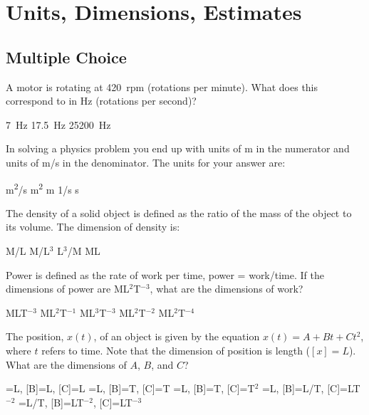\section{Units, Dimensions, Estimates}

\subsection{Multiple Choice}
\question A motor is rotating at \SI{420}{rpm} (rotations per minute). What does this correspond to in \si{Hz} (rotations per second)?
\begin{checkboxes}
\CorrectChoice \SI{7}{Hz} \correct
\choice \SI{17.5}{Hz}
\choice \SI{25200}{Hz}
\end{checkboxes}

\question In solving a physics problem you end up with units of \si{m} in the numerator and units of \si{m/s} in the denominator. The units for your answer are:
\begin{checkboxes}
\choice \si{m^2/s}
\choice \si{m^2}
\choice \si{m}
\choice \si{1/s}
\CorrectChoice  \si{s} \correct
\end{checkboxes}

\question The density of a solid object is defined as the ratio of the mass of the object to its volume. The dimension of density is:
\begin{checkboxes}
\choice M/L
\CorrectChoice  M/L$^3$ \correct
\choice L$^3$/M
\choice ML
\end{checkboxes}

\question Power is defined as the rate of work per time, power = work/time.  If the dimensions of power are ML$^2$T$^{-3}$, what are the dimensions of work?  
\begin{checkboxes}
\choice MLT$^{-3}$
\choice ML$^2$T$^{-1}$
\choice ML$^{3}$T$^{-3}$
\CorrectChoice ML$^{2}$T$^{-2}$ \correct
\choice ML$^2$T$^{-4}$
\end{checkboxes}

\question The position, $x(t)$, of an object is given by the equation $x(t) = A + Bt +Ct^2$, where $t$ refers to time. Note that the dimension of position is length ($[x]=L$).  What are the dimensions of $A$, $B$, and $C$?  
\begin{checkboxes}
\choice [A]=L, [B]=L, [C]=L
\choice [A]=L, [B]=T, [C]=T
\choice [A]=L, [B]=T, [C]=T$^2$
\CorrectChoice [A]=L, [B]=L/T, [C]=LT$^{-2}$ \correct
\choice [A]=L/T, [B]=LT$^{-2}$, [C]=LT$^{-3}$
\end{checkboxes}

